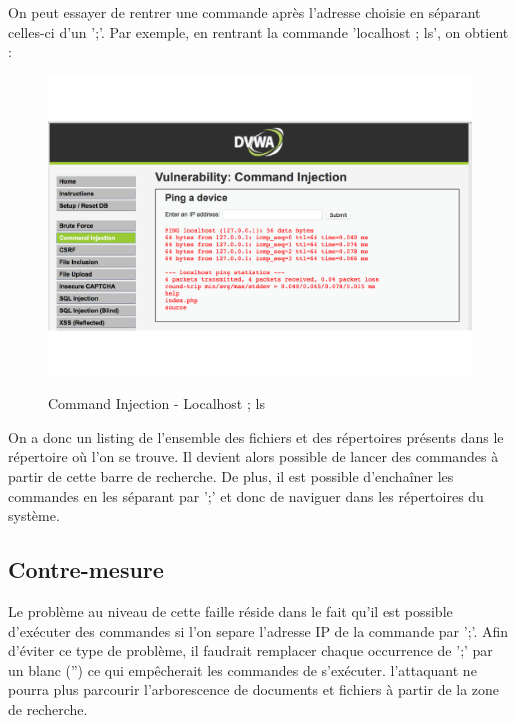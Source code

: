 On peut essayer de rentrer une commande après l’adresse choisie en séparant celles-ci d’un ';'. Par exemple, en rentrant la commande 'localhost ; ls', on obtient :

\begin{figure}[!h]
\begin{center}

\label{inclusion}
\includegraphics[scale=1.2]{images/CommandInjection-Localhostls.pdf}

\caption{Command Injection - Localhost ; ls}

\end{center}
\end{figure}

On a donc un listing de l’ensemble des fichiers et des répertoires présents dans le répertoire où l’on se trouve.
Il devient alors possible de lancer des commandes à partir de cette barre de recherche. De plus, il est possible d’enchaîner les commandes en les séparant par ';' et donc de naviguer dans les répertoires du système.


\subsection{Contre-mesure}

Le problème au niveau de cette faille réside dans le fait qu'il est possible d'exécuter des commandes si l'on separe l'adresse IP de la commande par ';'. Afin d'éviter ce type de problème, il faudrait remplacer chaque occurrence de ';' par un blanc ('') ce qui empêcherait les commandes de s'exécuter. l'attaquant ne pourra plus parcourir l'arborescence de documents et fichiers à partir de la zone de recherche.

